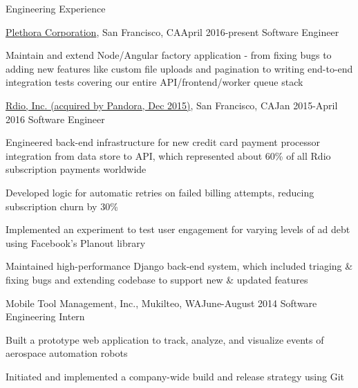 \documentclass{resume} %
\begin{document}

\begin{rSection}{Engineering Experience}

\begin{rSubsection}{\href{https://www.plethora.com/}{Plethora Corporation}, San Francisco, CA}{April 2016-present} {Software Engineer}

\item Maintain and extend Node/Angular factory application - from fixing bugs to
adding new features like custom file uploads and pagination to writing end-to-end integration tests covering
our entire API/frontend/worker queue stack

\end{rSubsection}

\begin{rSubsection}{\href{https://www.pandora.com/}{Rdio, Inc. (acquired by Pandora, Dec 2015)}, San Francisco, CA}{Jan 2015-April 2016} {Software Engineer}

\item Engineered back-end infrastructure for new credit card payment processor integration from data store to API, which represented about 60\% of all Rdio subscription payments worldwide
\item Developed logic for automatic retries on failed billing attempts, reducing subscription churn by 30\%
\item Implemented an experiment to test user engagement for varying levels of ad debt using Facebook's Planout library
\item Maintained high-performance Django back-end system, which included triaging \& fixing bugs and extending codebase to support new \& updated features
\end{rSubsection}

\begin{rSubsection}{Mobile Tool Management, Inc., Mukilteo, WA}{June-August 2014} {Software Engineering Intern}

\item Built a prototype web application to track, analyze, and visualize events of aerospace automation robots
\item Initiated and implemented a company-wide build and release strategy using Git
\end{rSubsection}


\end{rSection}
\end{document}
